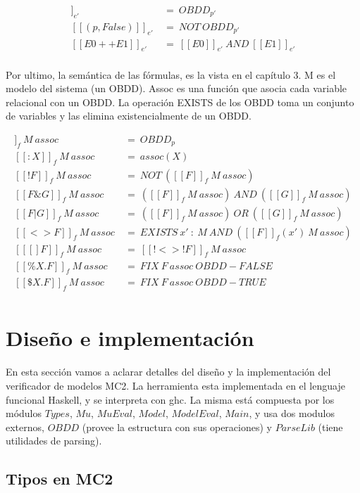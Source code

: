 \begin{align*}
[[(p,True)]]_{e'}\ &=\ OBDD_{p'} \\
[[(p,False)]]_{e'}\ &=\ NOT\ OBDD_{p'} \\
[[E0++E1]]_{e'}\ &=\ [[E0]]_{e'}\ AND\ [[E1]]_{e'} \\
\end{align*}

Por ultimo, la semántica de las fórmulas, es la vista en el capítulo 3. M es el modelo del sistema (un OBDD). Assoc es una función que asocia cada variable relacional con un OBDD. La operación EXISTS de los OBDD toma un conjunto de variables y las elimina existencialmente de un OBDD.

\begin{align*}
[[p]]_{f}\ M\ assoc\ &=\ OBDD_{p} \\
[[:X]]_{f}\ M\ assoc\ &=\ assoc(X) \\
[[!F]]_{f}\ M\ assoc\ &=\ NOT\ ([[F]]_{f}\ M\ assoc)\\
[[F \& G]]_{f}\ M\ assoc\ &=\ ([[F]]_{f}\ M\ assoc)\ AND\ ([[G]]_{f}\ M\ assoc)\\
[[F | G]]_{f}\ M\ assoc\ &=\ ([[F]]_{f}\ M\ assoc)\ OR\ ([[G]]_{f}\ M\ assoc)\\
[[<>F]]_{f}\ M\ assoc\ &=\ EXISTS\ x'\ :\ M\ AND\ ([[F]]_{f}(x')\ M\ assoc) \\
[[[]F]]_{f}\ M\ assoc\ &=\ [[!<>!F]]_{f}\ M\ assoc \\
[[\%X.F]]_{f}\ M\ assoc\ &=\ FIX\ F\ assoc\ OBDD-FALSE \\
[[\$X.F]]_{f}\ M\ assoc\ &=\ FIX\ F\ assoc\ OBDD-TRUE \\
\end{align*}

\section{Diseño e implementación}

En esta sección vamos a aclarar detalles del diseño y la implementación del verificador de modelos MC2. La herramienta esta implementada en el lenguaje funcional Haskell, y se interpreta con ghc. La misma está compuesta por los módulos $Types$, $Mu$, $MuEval$, $Model$, $ModelEval$, $Main$, y usa dos modulos externos, $OBDD$ \cite{Waldmann:6} (provee la estructura con sus operaciones) y $ParseLib$ \cite{Hutton:10} (tiene utilidades de parsing).

\subsection{Tipos en MC2}

